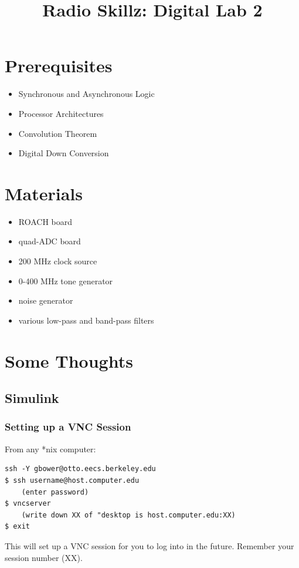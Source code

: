 \documentclass[11pt]{article}
\begin{document}
\title{Radio Skillz: Digital Lab 2}

\maketitle

\section*{Prerequisites}

\begin{itemize}
\item Synchronous and Asynchronous Logic
\item Processor Architectures
\item Convolution Theorem
\item Digital Down Conversion
\end{itemize}

\section*{Materials}

\begin{itemize}
\item ROACH board
\item quad-ADC board
\item 200 MHz clock source
\item 0-400 MHz tone generator
\item noise generator
\item various low-pass and band-pass filters
\end{itemize}

\section*{Some Thoughts}

\subsection*{Simulink}

\subsubsection*{Setting up a VNC Session}

From any *nix computer:
\begin{verbatim}
ssh -Y gbower@otto.eecs.berkeley.edu
$ ssh username@host.computer.edu
    (enter password)
$ vncserver
    (write down XX of "desktop is host.computer.edu:XX)
$ exit
\end{verbatim}
This will set up a VNC session for you to log into in the future.  Remember
your session number (XX).
\end{document}
